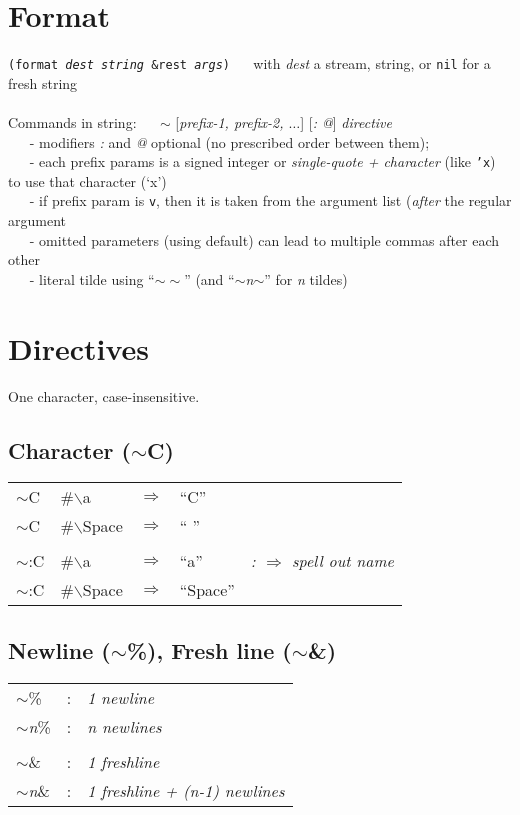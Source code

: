 \documentclass{article}
\begin{document}
\section{Format}
{\tt (format {\em dest string} \&rest {\em args})} $\quad$
with {\em dest} a stream, string, or {\tt nil} for a fresh string \\
\\
Commands in string: $\quad$
{\em $\sim$} [{\em prefix-1, prefix-2, $\ldots$}] [{\em : $\!$@}] {\em directive} \\
$~\quad$ - modifiers {\em :} and {\em @} optional (no prescribed order between them); \\
$~\quad$ - each prefix params is a signed integer or {\em single-quote + character} (like {\tt 'x})
           to use that character (`x') \\
$~\quad$ - if prefix param is {\tt v}, then it is taken from the argument list
           ({\em after} the regular argument \\
$~\quad$ - omitted parameters (using default) can lead to multiple commas after each other \\
$~\quad$ - literal tilde using ``$\sim\sim$'' (and ``$\sim${\em n}$\sim$'' for {\em n} tildes)


\section{Directives}
One character, case-insensitive.

\subsection{Character ($\sim$C)}

\begin{tabular}{lllll}
 $\sim$C  & \#$\backslash$a     & $\Rightarrow $ & ``C'' \\
 $\sim$C  & \#$\backslash$Space & $\Rightarrow $ & `` '' \\
\\
 $\sim$:C & \#$\backslash$a     & $\Rightarrow $ & ``a'' & {\em : $\Rightarrow$ spell out name} \\
 $\sim$:C & \#$\backslash$Space & $\Rightarrow $ & ``Space''
\end{tabular}

\subsection{Newline ($\sim$\%), Fresh line ($\sim$\&)}
\begin{tabular}{lll}
  $\sim$\%        & : & {\em 1 newline} \\
  $\sim${\em n}\% & : & {\em n newlines} \\
\\
  $\sim$\&        & : & {\em 1 freshline} \\
  $\sim${\em n}\& & : & {\em 1 freshline + (n-1) newlines}
\end{tabular}
\end{document}

